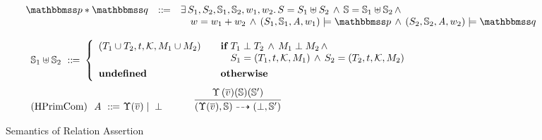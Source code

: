 \begin{figure*}[!t]
\[\begin{array}{lcl}
                {\relastP \sepstar \relastQ} & \define & 
                \exists \, \state_1, \state_2, \hpstate_1, \hpstate_2, 
                \word_1, \word_2. \, 
                \state = \state_1 \uplus \state_2 \, \land \, 
                \hpstate = \hpstate_1 \uplus \hpstate_2 \, \land \, 
                \\
                & & \quad
                \word = \word_1 + \word_2 \, \land \, 
                \asrtmodel{(\state_1, \hpstate_1, \primcom, \word_1)}{\relastP} 
                \, \land \, 
                \asrtmodel{(\state_2, \hpstate_2, \primcom, \word_2)}{\relastQ}
                \\
            \\
            \multicolumn{3}{l}
            {
                \begin{array}{l}
                    \hpstate_1 \uplus \hpstate_2 \ \define \ 
                    \left\{
                        \begin{array}{ll}
                            (\thrdpool_1 \cup \thrdpool_2, \thrdid, 
                                \hthrdlocalst, \Mem_1 \cup \Mem_2) & 
                            \quad \cif \ 
                            \thrdpool_1 \perp \thrdpool_2 \, \land \, 
                            \Mem_1 \perp \Mem_2 \, \land 
                            \\
                            & \qquad 
                            \state_1 = (\thrdpool_1, \thrdid, \hthrdlocalst, 
                                \Mem_1) \, \land \, 
                            \state_2 = (\thrdpool_2, \thrdid, \hthrdlocalst, 
                                \Mem_2) \\
                            \\[-8pt]
                            \undef & \quad \otherwise
                        \end{array} 
                  \right. 
                    \\
                    \\[-5pt]
                    \TYPE{(HPrimCom)} \ \ \primcom \ \define \ 
                    \hprim(\args{\val}) \sepline \primdone 
                    \qquad \quad 
                    \infer
                    {
                        \primTrans{(\hprim(\args{\val}), \hpstate)}
                            {(\primdone, \hpstate')}
                    }
                    {
                        \hprim\,(\args{\val})(\hpstate)(\hpstate')
                    } \qquad 
                \end{array}
            }
        \end{array}
    \]
    \vspace{-0.8em}
    \caption{Semantics of Relation Assertion}
    \label{fig:Semantics of Relation Assertion}
\end{figure*}

